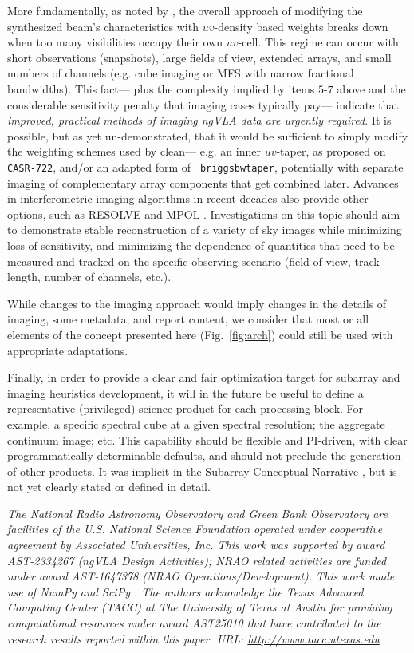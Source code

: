 \documentclass[11pt]{article}
\begin{document}
More fundamentally, as noted by \citep{memo78}, the overall approach
of modifying the synthesized beam's characteristics with $uv$-density
based weights breaks down when too many visibilities occupy their
own $uv$-cell. This regime can occur with short observations
(snapshots), large fields of view, extended arrays, and small numbers
of channels (e.g. cube imaging or MFS with narrow fractional
bandwidths). This fact--- plus the complexity implied by items $5$-$7$
above and the considerable sensitivity penalty that imaging cases
typically pay--- indicate that {\it improved, practical methods of
  imaging ngVLA data are urgently required}.  It is possible, but as
yet un-demonstrated, that it would be sufficient to simply modify the
weighting schemes used by clean--- e.g. an inner $uv$-taper, as
proposed on {\tt CASR-722}, and/or an adapted form of {\tt
  briggsbwtaper}, potentially with separate imaging of complementary
array components that get combined later. Advances in interferometric
imaging algorithms in recent decades also provide other options, such
as RESOLVE \citep{resolve} and MPOL \citep{mpol}. Investigations on
this topic should aim to demonstrate stable reconstruction of a
variety of sky images while minimizing loss of sensitivity, and
minimizing the dependence of quantities that need to be measured and 
tracked on the specific observing scenario (field of view, track
length, number of channels, etc.).

While changes to the imaging approach would imply changes in the
details of imaging, some metadata, and report content, we consider
that most or all elements of the concept presented here
(Fig.~\ref{fig:arch}) could still be used with appropriate
adaptations.

Finally, in order to provide a clear and fair optimization target for
subarray and imaging heuristics development, it will in the future be
useful to define a representative (privileged) science product for
each processing block. For example, a specific spectral cube at a
given spectral resolution; the aggregate continuum image; etc.  This
capability should be flexible and PI-driven, with clear
programmatically determinable defaults, and should not preclude the
generation of other products. It was implicit in the Subarray
Conceptual Narrative \citep{saNarrative}, but is not yet clearly
stated or defined in detail.

{\it The National Radio Astronomy Observatory and Green Bank
  Observatory are facilities of the U.S. National Science Foundation
  operated under cooperative agreement by Associated Universities,
  Inc. This work was supported by award AST-2334267 (ngVLA Design
  Activities); NRAO related activities are funded under award
  AST-1647378 (NRAO Operations/Development).
  This work made use of NumPy  \citep{numpy} and SciPy  \citep{scipy}.
  The authors acknowledge the Texas Advanced Computing Center
  (TACC) at The University of Texas at Austin for providing
  computational resources under award AST25010 that have contributed
  to the research results reported within this paper. URL:
  \url{http://www.tacc.utexas.edu}}
\end{document}
